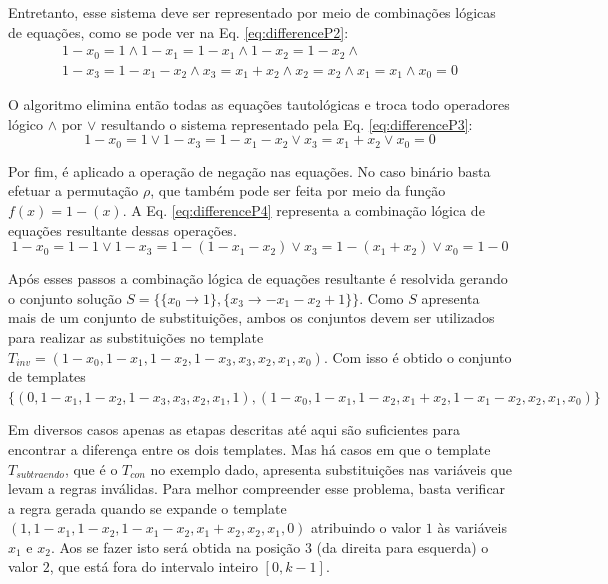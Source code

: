\documentclass[12pt, a4paper]{article}
\begin{document}
Entretanto, esse sistema deve ser representado por meio de combinações lógicas de equações, como se pode ver na Eq. \ref{eq:differenceP2}:
\begin{equation}
\begin{split}
1 - x_0	= 1				\wedge
1 - x_1	= 1 - x_1		\wedge
1 - x_2	= 1 - x_2		\wedge\\
1 - x_3	= 1 - x_1 - x_2	\wedge 
x_3		= x_1 + x_2		\wedge
x_2		= x_2			\wedge
x_1		= x_1			\wedge
x_0		= 0				
\label{eq:differenceP2}
\end{split}
\end{equation}

O algoritmo elimina então todas as equações tautológicas e troca todo operadores lógico $\wedge$ por $\vee$ resultando o sistema representado pela Eq. \ref{eq:differenceP3}:
\begin{equation}
1 - x_0	= 1				\vee 
1 - x_3	= 1 - x_1 - x_2	\vee
x_3		= x_1 + x_2		\vee 
x_0		= 0				
\label{eq:differenceP3}
\end{equation}

Por fim, é aplicado a operação de negação nas equações. No caso binário basta efetuar a permutação $\rho $, que também pode ser feita por meio da função $f(x) = 1 - (x)$. A Eq. \eqref{eq:differenceP4} representa a combinação lógica de equações resultante dessas operações.
\begin{equation}
1 - x_0	= 1 - 1					\vee 
1 - x_3	= 1 - (1 - x_1 - x_2)	\vee
x_3		= 1 - (x_1 + x_2)		\vee 
x_0		= 1 - 0				
\label{eq:differenceP4}
\end{equation}

Após esses passos a combinação lógica de equações resultante é resolvida gerando o conjunto solução $S = \{\{x_0\to 1\},\{x_3\to -x_1-x_2+1\}\}$. Como $S$ apresenta mais de um conjunto de substituições, ambos os conjuntos devem ser utilizados para realizar as substituições no template $T_{inv} = (1 - x_0, 1 - x_1, 1 - x_2, 1 - x_3, x_3, x_2, x_1, x_0)$. Com isso é obtido o conjunto de templates $\{(0, 1 - x_1, 1 - x_2, 1 - x_3, x_3, x_2, x_1, 1),(1 - x_0, 1 - x_1, 1 - x_2, x_1 + x_2, 1 - x_1 - x_2, x_2, x_1, x_0)\}$

Em diversos casos apenas as etapas descritas até aqui são suficientes para encontrar a diferença entre os dois templates. Mas há casos em que o template $T_{subtraendo}$, que é o $T_{con}$ no exemplo dado, apresenta substituições nas variáveis que levam a regras inválidas. Para melhor compreender esse problema, basta verificar a regra gerada quando se expande o template $(1, 1 - x_1, 1 - x_2, 1 - x_1 - x_2, x_1 + x_2, x_2, x_1, 0)$ atribuindo o valor $1$ às variáveis $x_1$ e $x_2$. Aos se fazer isto será obtida na posição $3$ (da direita para esquerda) o valor $2$, que está fora do intervalo inteiro $[0,k-1]$.
\end{document}
